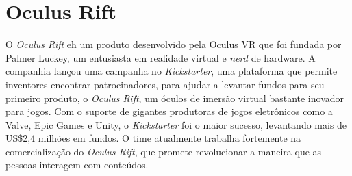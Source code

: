 \section{Oculus Rift} %
\label{sec:oculus_rift}

O \textit{Oculus Rift}\cite{oculusVR} eh um produto desenvolvido pela Oculus VR\textsuperscript{\textregistered} que foi fundada por Palmer Luckey, um entusiasta em realidade virtual e \textit{nerd} de hardware. A companhia lançou uma campanha no \textit{Kickstarter}\cite{kickstarter}, uma plataforma que permite inventores encontrar patrocinadores, para ajudar a levantar fundos para seu primeiro produto, o \textit{Oculus Rift}, um óculos de imersão virtual bastante inovador para jogos. Com o suporte de gigantes produtoras de jogos eletrônicos como a Valve, Epic Games e Unity, o \textit{Kickstarter} foi o maior sucesso, levantando mais de US\$2,4 milhões em fundos. O time atualmente trabalha fortemente na comercialização do \textit{Oculus Rift}, que promete revolucionar a maneira que as pessoas interagem com conteúdos. 

